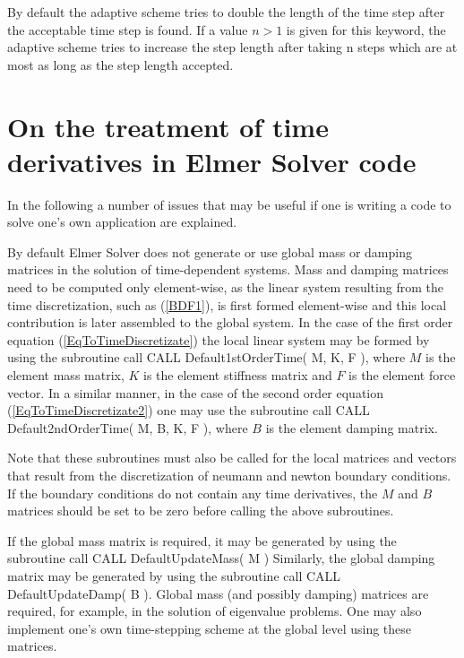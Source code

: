 By default the adaptive scheme tries to double the length of the time step 
after the acceptable time step is found. If a value $n>1$ is given for this keyword,
the adaptive scheme tries to increase the step length after taking n steps which are at 
most as long as the step length accepted.
\sifend

\section{On the treatment of time derivatives in Elmer Solver code}

In the following a number of issues that may be useful if one is writing a code
to solve one's own application are explained. 

By default Elmer Solver does not 
generate or use global mass or damping matrices in the solution of time-dependent 
systems. Mass and damping matrices need to be computed only element-wise, as  
the linear system resulting from the time discretization, such as (\ref{BDF1}),
is first formed element-wise and this local contribution is later assembled to the
global system. In the case of the first order equation (\ref{EqToTimeDiscretizate}) 
the local linear system may be formed by using the subroutine call
\ttbegin
 CALL Default1stOrderTime( M, K, F ),
\ttend
where $M$ is the element mass matrix, $K$ is the element stiffness matrix 
and $F$ is the element force vector. In a similar manner,
in the case of the second order equation (\ref{EqToTimeDiscretizate2}) 
one may use the subroutine call
\ttbegin
 CALL Default2ndOrderTime( M, B, K, F ),
\ttend
where $B$ is the element damping matrix.

Note that these subroutines must also be called for the local matrices and vectors
that result from the discretization of neumann and newton boundary
conditions. If the boundary conditions do not contain any time derivatives,
the $M$ and $B$ matrices should be set to be zero before calling the above subroutines.

If the global mass matrix is required, it may be generated by using the subroutine call
\ttbegin
 CALL DefaultUpdateMass( M )
\ttend
Similarly, the global damping matrix may be generated by using the subroutine call
\ttbegin
 CALL DefaultUpdateDamp( B ).
\ttend
Global mass (and possibly damping) matrices are required, for example, in the
solution of eigenvalue problems. One may also implement one's own time-stepping
scheme at the global level using these matrices.
   







